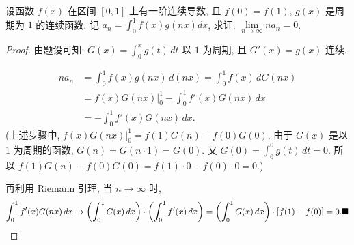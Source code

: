 \documentclass[lang=cn,newtx,10pt,scheme=chinese]{elegantbook}
\begin{document}
\begin{exercise}
设函数 $f(x)$ 在区间 $[0,1]$ 上有一阶连续导数, 且 $f(0)=f(1)$, $g(x)$ 是周期为 $1$ 的连续函数. 记 $a_n = \int_{0}^{1} f(x)g(nx)dx$, 求证: $\lim\limits_{n \to \infty} na_n = 0$.
\end{exercise}
\begin{proof}
由题设可知: $G(x) = \int_0^x g(t) \,dt$ 以 $1$ 为周期, 且 $G'(x) = g(x)$ 连续.

\begin{align*} na_n &= \int_0^1 f(x) g(nx) \,d(nx) = \int_0^1 f(x) \,dG(nx) \\ &= f(x)G(nx) \Big|_0^1 - \int_0^1 f'(x)G(nx) \,dx \\ &= -\int_0^1 f'(x)G(nx) \,dx. \end{align*}
(上述步骤中, $f(x)G(nx) \Big|_0^1 = f(1)G(n) - f(0)G(0)$. 由于 $G(x)$ 是以 $1$ 为周期的函数, $G(n) = G(n \cdot 1) = G(0)$. 又 $G(0) = \int_0^0 g(t) \,dt = 0$. 所以 $f(1)G(n) - f(0)G(0) = f(1) \cdot 0 - f(0) \cdot 0 = 0$.)

再利用 Riemann 引理, 当 $n \to \infty$ 时,
$$ \int_0^1 f'(x)G(nx) \,dx \to \left( \int_0^1 G(x) \,dx \right) \cdot \left( \int_0^1 f'(x) \,dx \right) = \left( \int_0^1 G(x) \,dx \right) \cdot [f(1)-f(0)] = 0. \hfill \blacksquare $$

\end{proof}
\end{document}
